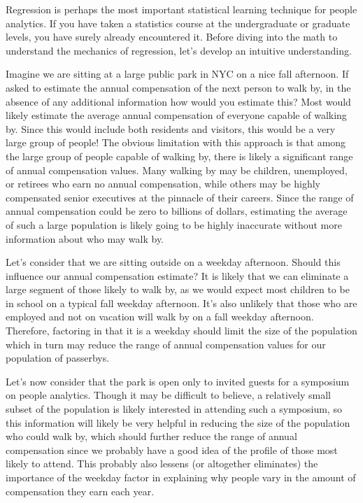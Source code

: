 \documentclass[]{book}
\begin{document}
Regression is perhaps the most important statistical learning technique for people analytics. If you have taken a statistics course at the undergraduate or graduate levels, you have surely already encountered it. Before diving into the math to understand the mechanics of regression, let's develop an intuitive understanding.

Imagine we are sitting at a large public park in NYC on a nice fall afternoon. If asked to estimate the annual compensation of the next person to walk by, in the absence of any additional information how would you estimate this? Most would likely estimate the average annual compensation of everyone capable of walking by. Since this would include both residents and visitors, this would be a very large group of people! The obvious limitation with this approach is that among the large group of people capable of walking by, there is likely a significant range of annual compensation values. Many walking by may be children, unemployed, or retirees who earn no annual compensation, while others may be highly compensated senior executives at the pinnacle of their careers. Since the range of annual compensation could be zero to billions of dollars, estimating the average of such a large population is likely going to be highly inaccurate without more information about who may walk by.

Let's consider that we are sitting outside on a weekday afternoon. Should this influence our annual compensation estimate? It is likely that we can eliminate a large segment of those likely to walk by, as we would expect most children to be in school on a typical fall weekday afternoon. It's also unlikely that those who are employed and not on vacation will walk by on a fall weekday afternoon. Therefore, factoring in that it is a weekday should limit the size of the population which in turn may reduce the range of annual compensation values for our population of passerbys.

Let's now consider that the park is open only to invited guests for a symposium on people analytics. Though it may be difficult to believe, a relatively small subset of the population is likely interested in attending such a symposium, so this information will likely be very helpful in reducing the size of the population who could walk by, which should further reduce the range of annual compensation since we probably have a good idea of the profile of those most likely to attend. This probably also lessens (or altogether eliminates) the importance of the weekday factor in explaining why people vary in the amount of compensation they earn each year.
\end{document}

